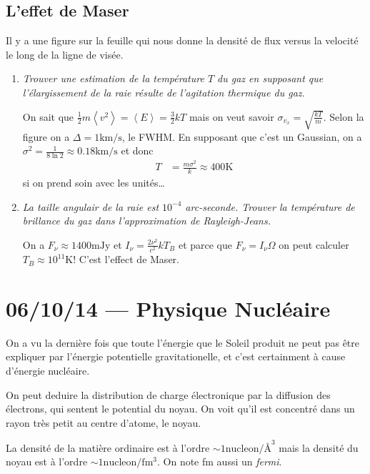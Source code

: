 \documentclass[10pt]{report}
\newcommand{\expvalue}[1]{\left<#1\right>}
\begin{document}
\section{L'effet de Maser}

Il y a une figure sur la feuille qui nous donne la densit\'e de flux versus la velocit\'e le long de la ligne de vis\'ee.
\begin{enumerate}[1.]
    \item \emph{Trouver une estimation de la temp\'erature $T$ du gaz en supposant que l'\'elargissement de la raie r\'esulte de l'agitation thermique du gaz.}

        On sait que $\frac{1}{2}m\expvalue{v^2} = \expvalue{E} = \frac{3}{2}kT$ mais on veut savoir $\sigma_{v_x} = \sqrt{\frac{kT}{m}}$. Selon la figure on a $\Delta = 1\mathrm{km/s}$, le FWHM. En supposant que c'est un Gaussian, on a $\sigma^2 = \frac{1}{8\ln 2}\approx 0.18\mathrm{km/s}$ et donc
        \begin{align}
            T &= \frac{m\sigma^2}{k} \approx 400\mathrm{K}
        \end{align}
        si on prend soin avec les unit\'es\dots

    \item \emph{La taille angulair de la raie est $10^{-4}$ arc-seconde. Trouver la temp\'erature de brillance du gaz dans l'approximation de Rayleigh-Jeans.}

        On a $F_\nu \approx 1400 \mathrm{mJy}$ et $I_\nu = \frac{2\nu^2}{c^2} kT_B$ et parce que $F_\nu = I_\nu \Omega$ on peut calculer $T_B \approx 10^{11}\mathrm{K}$! C'est l'effect de Maser.
\end{enumerate}

\chapter{06/10/14 --- Physique Nucl\'eaire}

On a vu la derni\`ere fois que toute l'\'energie que le Soleil produit ne peut pas \^etre expliquer par l'\'energie potentielle gravitationelle, et c'est certainment \`a cause d'\'energie nucl\'eaire.

On peut deduire la distribution de charge \'electronique par la diffusion des \'electrons, qui sentent le potential du noyau. On voit qu'il est concentr\'e dans un rayon tr\`es petit au centre d'atome, le noyau.

La densit\'e de la mati\`ere ordinaire est \`a l'ordre $\sim 1 \mathrm{nucleon/\text{\AA}^3}$ mais la densit\'e du noyau est \`a l'ordre $\sim 1 \mathrm{nucleon/fm^3}$. On note fm aussi un \emph{fermi}. 
\end{document}
